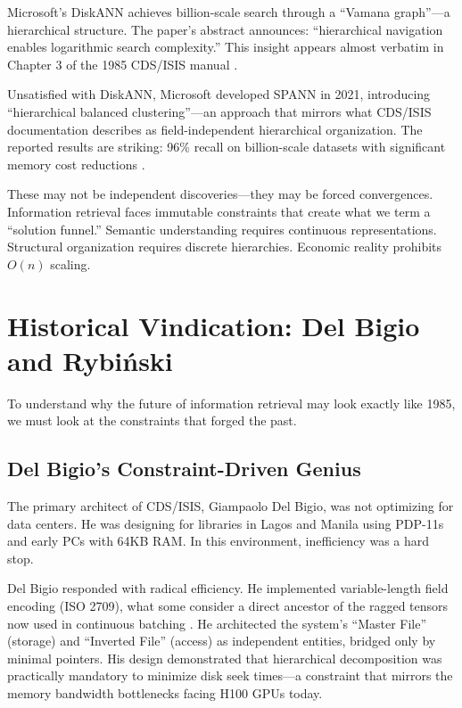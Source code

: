 \documentclass[manuscript,screen,nonacm]{acmart}
\begin{document}
Microsoft's DiskANN achieves billion-scale search through a ``Vamana graph''---a hierarchical structure. The paper's abstract announces: ``hierarchical navigation enables logarithmic search complexity.'' This insight appears almost verbatim in Chapter 3 of the 1985 CDS/ISIS manual \cite{unesco1989}.

Unsatisfied with DiskANN, Microsoft developed SPANN in 2021, introducing ``hierarchical balanced clustering''---an approach that mirrors what CDS/ISIS documentation describes as field-independent hierarchical organization. The reported results are striking: 96\% recall on billion-scale datasets with significant memory cost reductions \cite{chen2021}.

These may not be independent discoveries---they may be forced convergences. Information retrieval faces immutable constraints that create what we term a ``solution funnel.'' Semantic understanding requires continuous representations. Structural organization requires discrete hierarchies. Economic reality prohibits $O(n)$ scaling.

\section{Historical Vindication: Del Bigio and Rybi\'{n}ski}

To understand why the future of information retrieval may look exactly like 1985, we must look at the constraints that forged the past.

\subsection{Del Bigio's Constraint-Driven Genius}

The primary architect of CDS/ISIS, Giampaolo Del Bigio, was not optimizing for data centers. He was designing for libraries in Lagos and Manila using PDP-11s and early PCs with 64KB RAM. In this environment, inefficiency was a hard stop.

Del Bigio responded with radical efficiency. He implemented variable-length field encoding (ISO 2709), what some consider a direct ancestor of the ragged tensors now used in continuous batching \cite{iso2709}. He architected the system's ``Master File'' (storage) and ``Inverted File'' (access) as independent entities, bridged only by minimal pointers. His design demonstrated that hierarchical decomposition was practically mandatory to minimize disk seek times---a constraint that mirrors the memory bandwidth bottlenecks facing H100 GPUs today.
\end{document}
